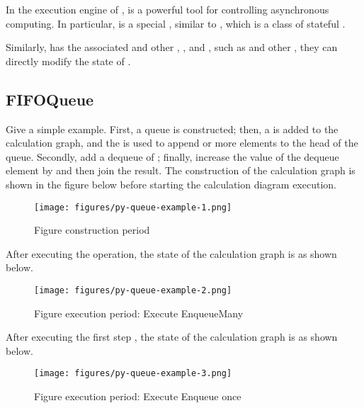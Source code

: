 \begin{content}

In the execution engine of ,  is a powerful tool for controlling asynchronous computing. In particular,  is a special , similar to , which is a class of stateful .

Similarly,  has the associated  and other , , and , such as  and other , they can directly modify the state of .

\subsection{FIFOQueue}

Give a simple example. First, a  queue is constructed; then, a  is added to the calculation graph, and the  is used to append  or more elements to the head of the queue. Secondly, add a dequeue of ; finally, increase the value of the dequeue element by  and then join the result. The construction of the calculation graph is shown in the figure below before starting the calculation diagram execution.

\begin{figure}[!h]
\centering
\texttt{[image: figures/py-queue-example-1.png]}
\caption{Figure construction period}
 \label{fig:py-queue-example-1}
\end{figure}

After executing the  operation, the state of the calculation graph is as shown below.

\begin{figure}[!h]
\centering
\texttt{[image: figures/py-queue-example-2.png]}
\caption{Figure execution period: Execute EnqueueMany}
 \label{fig:py-queue-example-2}
\end{figure}


After executing the first step , the state of the calculation graph is as shown below.

\begin{figure}[!h]
\centering
\texttt{[image: figures/py-queue-example-3.png]}
\caption{Figure execution period: Execute Enqueue once}
 \label{fig:py-queue-example-3}
\end{figure}


\end{content}
